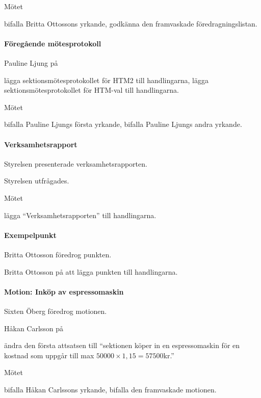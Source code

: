 \documentclass{dsekminutes}
\begin{document}
Mötet 
\begin{attlist}
  \att bifalla Britta Ottossons yrkande,
  \att godkänna den framvaskade föredragningslistan.
\end{attlist}

\paragraph{Föregående mötesprotokoll}
Pauline Ljung \yrkade på
\begin{attlist}
  \att lägga sektionsmötesprotokollet för HTM2 till handlingarna,
  \att lägga sektionsmötesprotokollet för HTM-val till handlingarna.
\end{attlist}

Mötet 
\begin{attlist}
  \att bifalla Pauline Ljungs första yrkande,
  \att bifalla Pauline Ljungs andra yrkande.
\end{attlist}

\paragraph{Verksamhetsrapport}
Styrelsen presenterade verksamhetsrapporten.

Styrelsen utfrågades.

Mötet 
\begin{attlist}
  \att lägga “Verksamhetsrapporten” till handlingarna.
\end{attlist}

\paragraph{Exempelpunkt}
Britta Ottosson föredrog punkten.

Britta Ottosson \yrkade på att lägga punkten till handlingarna.

\paragraph{Motion: Inköp av espressomaskin}
Sixten Öberg föredrog motionen.

Håkan Carlsson  på
\begin{attlist}
  \att ändra den första attsatsen till ``sektionen köper in en
  espresso\-maskin för en kostnad som uppgår till max \(50000 \times 1,15 =
  57500\)kr.''
\end{attlist}

Mötet 
\begin{attlist}
  \att bifalla Håkan Carlssons yrkande,
  \att bifalla den framvaskade motionen.
\end{attlist}
\end{document}

